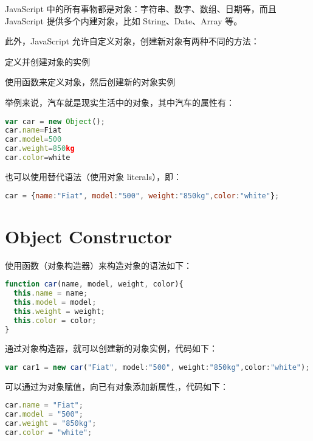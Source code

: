 JavaScript 中的所有事物都是对象：字符串、数字、数组、日期等，而且JavaScript 提供多个内建对象，比如 String、Date、Array 等。

此外，JavaScript 允许自定义对象，创建新对象有两种不同的方法：

\begin{compactitem}
\item 定义并创建对象的实例
\item 使用函数来定义对象，然后创建新的对象实例
\end{compactitem}





举例来说，汽车就是现实生活中的对象，其中汽车的属性有：



\begin{lstlisting}[language=JavaScript]
var car = new Object();
car.name=Fiat
car.model=500
car.weight=850kg
car.color=white 
\end{lstlisting}

也可以使用替代语法（使用对象 literals），即：

\begin{lstlisting}[language=JavaScript]
car = {name:"Fiat", model:"500", weight:"850kg",color:"white"};
\end{lstlisting}

\section{Object Constructor}

使用函数（对象构造器）来构造对象的语法如下：



\begin{lstlisting}[language=JavaScript]
function car(name, model, weight, color){
  this.name = name;
  this.model = model;
  this.weight = weight;
  this.color = color;
}
\end{lstlisting}

通过对象构造器，就可以创建新的对象实例，代码如下：

\begin{lstlisting}[language=JavaScript]
var car1 = new car("Fiat", model:"500", weight:"850kg",color:"white");
\end{lstlisting}

可以通过为对象赋值，向已有对象添加新属性,，代码如下：


\begin{lstlisting}[language=JavaScript]
car.name = "Fiat";
car.model = "500";
car.weight = "850kg";
car.color = "white";
\end{lstlisting}




